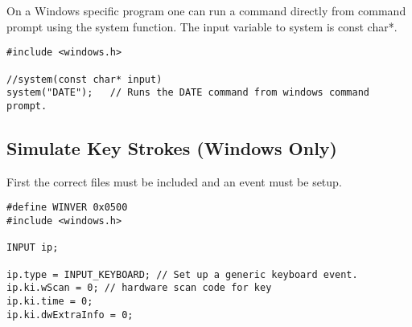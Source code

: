 On a Windows specific program one can run a command directly from command prompt using the system function. The input variable to system is const char*.
\begin{lstlisting}
#include <windows.h>

//system(const char* input)
system("DATE");   // Runs the DATE command from windows command prompt.
\end{lstlisting}










\subsection{Simulate Key Strokes (Windows Only)}

First the correct files must be included and an event must be setup.
\begin{lstlisting}
#define WINVER 0x0500
#include <windows.h> 

INPUT ip;

ip.type = INPUT_KEYBOARD; // Set up a generic keyboard event.    
ip.ki.wScan = 0; // hardware scan code for key                                   
ip.ki.time = 0;
ip.ki.dwExtraInfo = 0;
\end{lstlisting}

